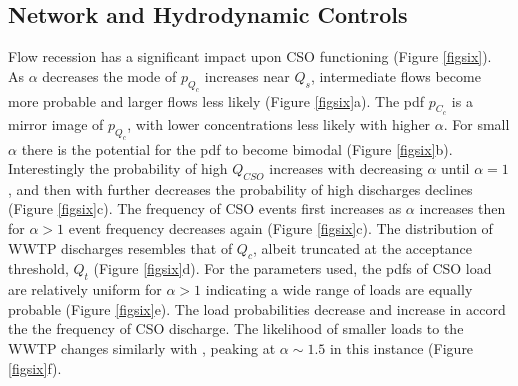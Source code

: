 \documentclass[draft,linenumbers]{agujournal2018}
\begin{document}
\subsection{Network and Hydrodynamic Controls}
Flow recession has a signif\/icant impact upon CSO functioning (Figure \ref{figsix}). As $\alpha$ decreases the mode of $p_{Q_c}$ increases near $Q_s$, intermediate f\/lows become more probable and larger f\/lows less likely (Figure \ref{figsix}a). The pdf $p_{C_c}$ is a mirror image of $p_{Q_c}$, with lower concentrations less likely with higher $\alpha$. For small $\alpha$ there is the potential for the pdf to become bimodal (Figure \ref{figsix}b). Interestingly the probability of high $Q_{CSO}$ increases with decreasing $\alpha$ until $\alpha = 1$, and then with further decreases the probability of high discharges declines (Figure \ref{figsix}c). The frequency of CSO events f\/irst increases as $\alpha$ increases then for $\alpha > 1$ event frequency decreases again (Figure \ref{figsix}c). The distribution of WWTP discharges resembles that of $Q_c$, albeit truncated at the acceptance threshold, $Q_t$ (Figure \ref{figsix}d). For the parameters used, the pdfs of CSO load are relatively uniform for $\alpha > 1$ indicating a wide range of loads are equally probable (Figure \ref{figsix}e). The load probabilities decrease and increase in accord the the frequency of CSO discharge. The likelihood of smaller loads to the WWTP changes similarly with , peaking at $\alpha \sim 1.5$ in this instance (Figure \ref{figsix}f). 
\end{document}
